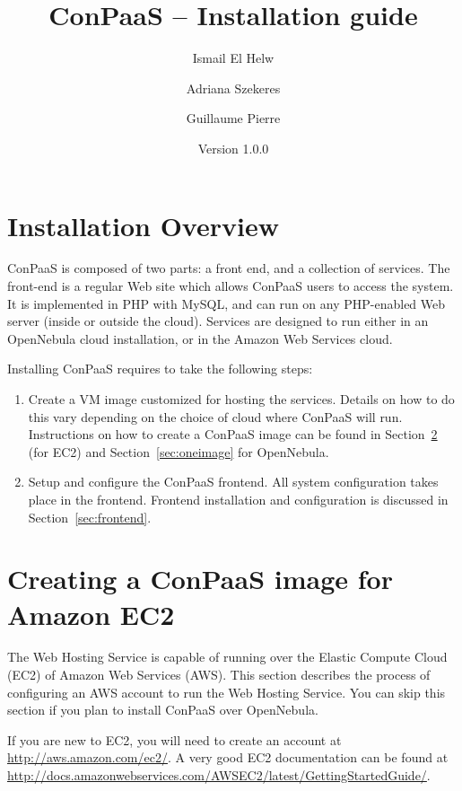 \documentclass[10pt]{article}
\begin{document}
\title{ConPaaS -- Installation guide}
\author{Ismail El Helw \and Adriana Szekeres \and Guillaume Pierre}
\date{Version 1.0.0}
\maketitle

\vfil
\tableofcontents
\vfil
\newpage

\section{Installation Overview}

ConPaaS is composed of two parts: a front end, and a collection of
services. The front-end is a regular Web site which allows ConPaaS
users to access the system. It is implemented in PHP with MySQL, and
can run on any PHP-enabled Web server (inside or outside the cloud).
Services are designed to run either in an OpenNebula cloud
installation, or in the Amazon Web Services cloud.

Installing ConPaaS requires to take the following steps:

\begin{enumerate}
\item Create a VM image customized for hosting the services. Details
  on how to do this vary depending on the choice of cloud where
  ConPaaS will run. Instructions on how to create a ConPaaS image can
  be found in Section~\ref{sec:ec2image} (for EC2) and
  Section~\ref{sec:oneimage} for OpenNebula.
\item Setup and configure the ConPaaS frontend. All system
  configuration takes place in the frontend. Frontend installation and
  configuration is discussed in Section~\ref{sec:frontend}.
\end{enumerate}

\section{Creating a ConPaaS image for Amazon EC2}
\label{sec:ec2image}

The Web Hosting Service is capable of running over the Elastic Compute
Cloud (EC2) of Amazon Web Services (AWS). This section describes the
process of configuring an AWS account to run the Web Hosting Service.
You can skip this section if you plan to install ConPaaS over
OpenNebula.

If you are new to EC2, you will need to create an account at
\url{http://aws.amazon.com/ec2/}. A very good EC2 documentation can be
found at
\url{http://docs.amazonwebservices.com/AWSEC2/latest/GettingStartedGuide/}.
\end{document}
